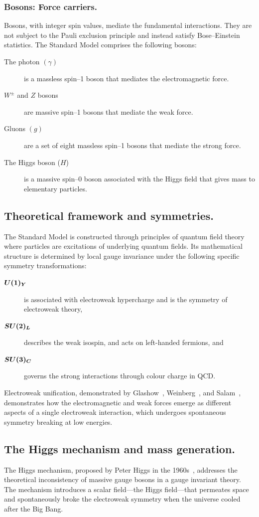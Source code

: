 \begin{definition}
\subsubsection{Bosons: Force carriers.}
Bosons, with integer spin values, mediate the fundamental interactions.
%
They are not subject to the Pauli exclusion principle and instead satisfy Bose--Einstein statistics.
%
The Standard Model comprises the following bosons:
\begin{description}
    \item [The photon $(\gamma)$] is a massless spin--1 boson that mediates the electromagnetic force.
    \item [$W^\pm$ and $Z$ bosons] are massive spin--1 bosons that mediate the weak force.
    \item [Gluons $(g)$] are a set of eight massless spin--1 bosons that mediate the strong force.
    \item [The Higgs boson ($H$)] is a massive spin--0 boson associated with the Higgs field that gives mass to elementary particles.
\end{description}

\subsection{Theoretical framework and symmetries.}
The Standard Model is constructed through principles of quantum field theory where particles are excitations of underlying quantum fields.
%
Its mathematical structure is determined by local gauge invariance under the following specific symmetry transformations:
\begin{description}
    \item [$\vb*{U(1)_Y}$] is associated with electroweak hypercharge and is the symmetry of electroweak theory,
    \item [$\vb*{SU(2)_L}$] describes the weak isospin, and acts on left-handed fermions, and
    \item [$\vb*{SU(3)_C}$] governs the strong interactions through colour charge in QCD.
\end{description}

Electroweak unification, demonstrated by Glashow~\cite{Glashow:1961tr}, Weinberg~\cite{Weinberg:1979pi}, and Salam~\cite{Salam:1980jd}, demonstrates how the electromagnetic and weak forces emerge as different aspects of a single electroweak interaction, which undergoes spontaneous symmetry breaking at low energies.

\subsection{The Higgs mechanism and mass generation.}
The Higgs mechanism, proposed by Peter Higgs in the 1960s~\cite{PhysRevLett.13.508}, addresses the theoretical inconsistency of massive gauge bosons in a gauge invariant theory.
%
The mechanism introduces a scalar field---the Higgs field---that permeates space and spontaneously broke the electroweak symmetry when the universe cooled after the Big Bang.


\end{definition}
